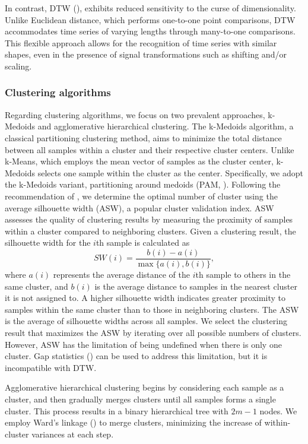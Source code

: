 \documentclass[a4paper,review,12pt,authoryear]{elsarticle}
\begin{document}
In contrast, DTW (\citealp{sakoeDynamicProgrammingAlgorithm1978}), exhibits reduced sensitivity to the curse of dimensionality. Unlike Euclidean distance, which performs one-to-one point comparisons, DTW accommodates time series of varying lengths through many-to-one comparisons. This flexible approach allows for the recognition of time series with similar shapes, even in the presence of signal transformations such as shifting and/or scaling.


\subsubsection*{Clustering algorithms}
\label{sec:clustering}


Regarding clustering algorithms, we focus on two prevalent approaches, k-Medoids and agglomerative hierarchical clustering. The k-Medoids algorithm, a classical partitioning clustering method, aims to minimize the total distance between all samples within a cluster and their respective cluster centers. 
Unlike k-Means, which employs the mean vector of samples as the cluster center, k-Medoids selects one sample within the cluster as the center. 
Specifically, we adopt the k-Medoids variant, partitioning around medoids (PAM, \citealp{PartitioningMedoidsProgram1990}).
Following the recommendation of \cite{PartitioningMedoidsProgram1990}, we determine the optimal number of cluster using the average silhouette width (ASW), a popular cluster validation index.
ASW assesses the quality of clustering results by measuring the proximity of samples within a cluster compared to neighboring clusters.
Given a clustering result, the silhouette width for the $i$th sample is calculated as 
\[
  SW(i) = \frac{b(i)-a(i)}{\max\{a(i), b(i)\}},  
\]
where $a(i)$ represents the average distance of the $i$th sample to others in the same cluster, and $b(i)$ is the average distance to samples in the nearest cluster it is not assigned to. A higher silhouette width indicates greater proximity to samples within the same cluster than to those in neighboring clusters. The ASW is the average of silhouette widths across all samples. We select the clustering result that maximizes the ASW by iterating over all possible numbers of clusters. However, ASW has the limitation of being undefined when there is only one cluster. Gap statistics (\citealp{tibshiraniEstimatingNumberClusters2002}) can be used to address this limitation, but it is incompatible with DTW.

Agglomerative hierarchical clustering begins by considering each sample as a cluster, and then gradually merges clusters until all samples forms a single cluster. 
This process results in a binary hierarchical tree with $2m-1$ nodes. We employ Ward's linkage (\citealp{murtaghWardHierarchicalAgglomerative2014a}) to merge clusters, minimizing the increase of within-cluster variances at each step. 
\end{document}
